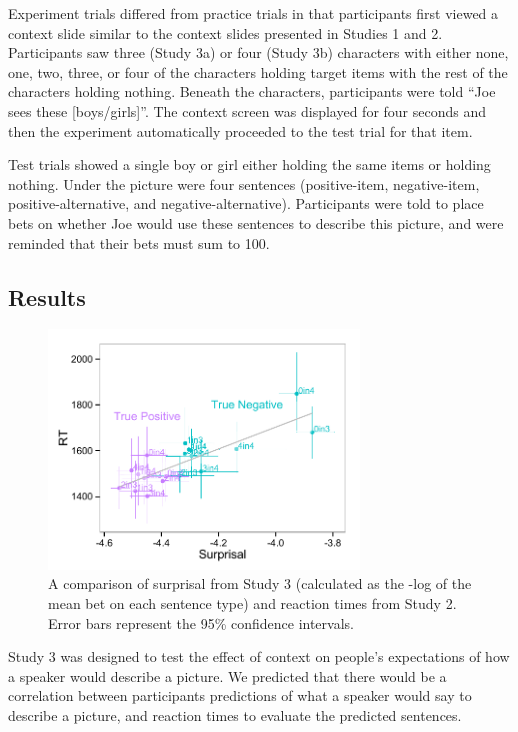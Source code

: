 \documentclass[10pt,letterpaper]{article}
\begin{document}
Experiment trials differed from practice trials in that participants first viewed a context slide similar to the context slides presented in Studies 1 and 2.  Participants saw three (Study 3a) or four (Study 3b) characters with either none, one, two, three, or four of the characters holding target items with the rest of the characters holding nothing.  Beneath the characters, participants were told ``Joe sees these [boys/girls]''.  The context screen was displayed for four seconds and then the experiment automatically proceeded to the test trial for that item.  

Test trials showed a single boy or girl either holding the same items or holding nothing.  Under the picture were four sentences (positive-item, negative-item, positive-alternative, and negative-alternative).  Participants were told to place bets on whether Joe would use these sentences to describe this picture, and were reminded that their bets must sum to 100.  

\subsection{Results}
\begin{figure}
\begin{center} 
\includegraphics[width=3.25in]{figures/speakerstudy_comparison.pdf}
\caption{\label{fig:e3plot} A comparison of surprisal from Study 3 (calculated as the -log of the mean bet on each sentence type) and reaction times from Study 2.  Error bars represent the 95\% confidence intervals.  }
\end{center} 
\end{figure}

Study 3 was designed to test the effect of context on people's expectations of how a speaker would describe a picture.  We predicted that there would be a correlation between participants predictions of what a speaker would say to describe a picture, and reaction times to evaluate the predicted sentences.  
\end{document}
